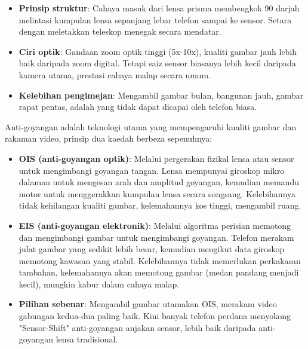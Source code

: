 \begin{itemize}
  \item \textbf{Prinsip struktur}: Cahaya masuk dari lensa prisma membengkok 90 darjah melintasi kumpulan lensa sepanjang lebar telefon sampai ke sensor. Setara dengan meletakkan teleskop menegak secara mendatar.
  \item \textbf{Ciri optik}: Gandaan zoom optik tinggi (5x-10x), kualiti gambar jauh lebih baik daripada zoom digital. Tetapi saiz sensor biasanya lebih kecil daripada kamera utama, prestasi cahaya malap secara umum.
  \item \textbf{Kelebihan pengimejan}: Mengambil gambar bulan, bangunan jauh, gambar rapat pentas, adalah yang tidak dapat dicapai oleh telefon biasa.
\end{itemize}


Anti-goyangan adalah teknologi utama yang mempengaruhi kualiti gambar dan rakaman video, prinsip dua kaedah berbeza sepenuhnya:

\begin{itemize}
  \item \textbf{OIS (anti-goyangan optik)}: Melalui pergerakan fizikal lensa atau sensor untuk mengimbangi goyangan tangan. Lensa mempunyai giroskop mikro dalaman untuk mengesan arah dan amplitud goyangan, kemudian memandu motor untuk menggerakkan kumpulan lensa secara songsang. Kelebihannya tidak kehilangan kualiti gambar, kelemahannya kos tinggi, mengambil ruang.
  \item \textbf{EIS (anti-goyangan elektronik)}: Melalui algoritma perisian memotong dan mengimbangi gambar untuk mengimbangi goyangan. Telefon merakam julat gambar yang sedikit lebih besar, kemudian mengikut data giroskop memotong kawasan yang stabil. Kelebihannya tidak memerlukan perkakasan tambahan, kelemahannya akan memotong gambar (medan pandang menjadi kecil), mungkin kabur dalam cahaya malap.
  \item \textbf{Pilihan sebenar}: Mengambil gambar utamakan OIS, merakam video gabungan kedua-dua paling baik. Kini banyak telefon perdana menyokong "Sensor-Shift" anti-goyangan anjakan sensor, lebih baik daripada anti-goyangan lensa tradisional.
\end{itemize}


